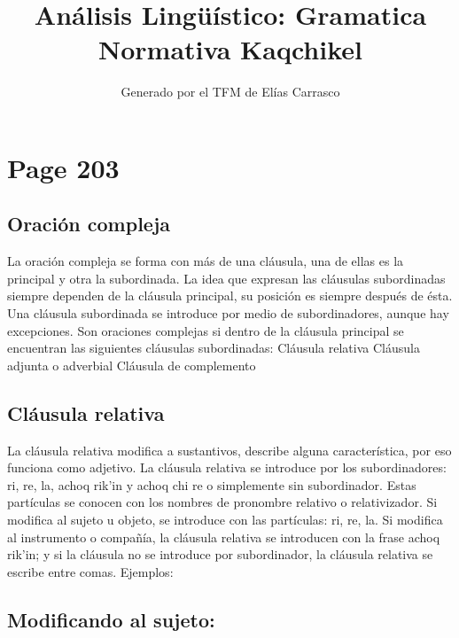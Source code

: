 \documentclass{article}%
\title{Análisis Lingüístico: Gramatica Normativa Kaqchikel}%
\author{Generado por el TFM de Elías Carrasco}%
\begin{document}
%
\normalsize%
\maketitle%
\section{Page 203}%
\label{sec:Page203}%
\subsection{Oración compleja}%
\label{subsec:Oracincompleja}%

%
La oración compleja se forma con más de una cláusula, una de ellas es la principal y %
otra la subordinada. La idea que expresan las cláusulas subordinadas siempre dependen %
de la cláusula principal, su posición es siempre después de ésta. Una cláusula subordinada %
se introduce por medio de subordinadores, aunque hay excepciones. Son oraciones %
complejas si dentro de la cláusula principal se encuentran las siguientes cláusulas %
subordinadas: %
Cláusula relativa %
Cláusula adjunta o adverbial %
Cláusula de complemento %
\subsection{Cláusula relativa}%
\label{subsec:Clusularelativa}%

%
La cláusula relativa modifica a sustantivos, describe alguna característica, por eso %
funciona como adjetivo. La cláusula relativa se introduce por los subordinadores: ri, %
re, la, achoq rik'in y achoq chi re o simplemente sin subordinador. Estas partículas se %
conocen con los nombres de pronombre relativo o relativizador. Si modifica al sujeto u %
objeto, se introduce con las partículas: ri, re, la. Si modifica al instrumento o compañía, %
la cláusula relativa se introducen con la frase achoq rik'in; y si la cláusula no se %
introduce por subordinador, la cláusula relativa se escribe entre comas. Ejemplos: %
\subsection{Modificando al sujeto:}%
\label{subsec:Modificandoalsujeto}%
\end{document}
